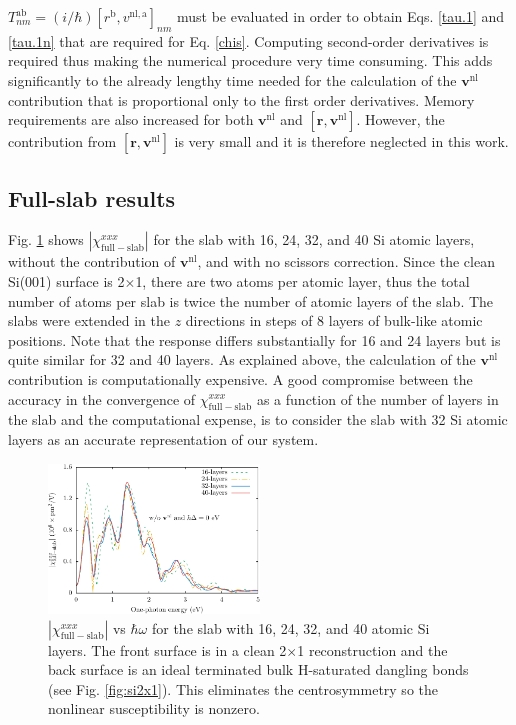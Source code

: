 $T^{\mathrm{a}\mathrm{b}}_{nm}=(i/\hbar)
[r^\mathrm{b},v^{\mathrm{nl},\mathrm{a}}]_{nm}$ must be evaluated in order to
obtain Eqs. \eqref{tau.1} and \eqref{tau.1n} that are required for Eq.
\eqref{chis}. Computing second-order derivatives is required thus making the
numerical procedure very time consuming. This adds significantly to the already
lengthy time needed for the calculation of the $\mathbf{v}^\mathrm{nl}$
contribution that is proportional only to the first order derivatives. Memory
requirements are also increased for both $\mathbf{v}^\mathrm{nl}$ and
$[\mathbf{r},\mathbf{v}^\mathrm{nl}]$. However, the contribution from
$[\mathbf{r},\mathbf{v}^\mathrm{nl}]$ is very small \cite{valerie} and it is
therefore neglected in this work.



\subsection{Full-slab results}\label{sec:fsresults}

Fig. \ref{fig:layersconv} shows $|\chi_{\mathrm{full-slab}}^{xxx}|$ for the slab
with 16, 24, 32, and 40 Si atomic layers, without the contribution of
$\mathbf{v}^{\mathrm{nl}}$, and with no scissors correction. Since the clean
Si(001) surface is 2$\times$1, there are two atoms per atomic layer, thus the
total number of atoms per slab is twice the number of atomic layers of the slab.
The slabs were extended in the $z$ directions in steps of 8 layers of bulk-like
atomic positions. Note that the response differs substantially for 16 and 24
layers but is quite similar for 32 and 40 layers. As explained above, the
calculation of the $\mathbf{v}^\mathrm{nl}$ contribution is computationally
expensive. A good compromise between the accuracy in the convergence of
$\chi^{xxx}_{\mathrm{full-slab}}$ as a function of the number of layers in the
slab and the computational expense, is to consider the slab with 32 Si atomic
layers as an accurate representation of our system.

\begin{figure}[H]
\centering 
\includegraphics[width=0.5\textwidth]{content/figures/fig-4_1_02}
\caption{$|\chi_{\mathrm{full-slab}}^{xxx}|$ vs $\hbar\omega$
for the slab with 16, 24, 32, and 40 atomic Si layers. The front surface is in a
clean 2$\times$1 reconstruction and the back surface is an ideal terminated bulk
H-saturated dangling bonds (see Fig. \ref{fig:si2x1}). This eliminates the
centrosymmetry so the nonlinear susceptibility is nonzero.
\label{fig:layersconv}}
\end{figure}


